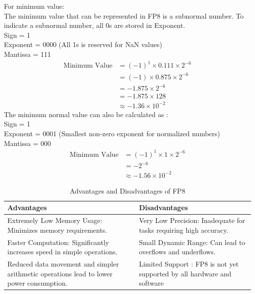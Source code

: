 \documentclass{ioereport}
\begin{document}
\begin{enumerate}[label=\textbf{\roman*.}]
    For minimum value:\\
    The minimum value that can be represented in FP8 is a subnormal number. To indicate a subnormal number, all 0s are stored in Exponent. \\
    Sign = 1 \\
    Exponent = 0000 (All 1s is reserved for NaN values) \\
    Mantissa = 111 
    \[
    \begin{aligned}
        \text{Minimum Value} &= (-1)^{1} \times 0.111 \times 2^{-6} \\
        &= (-1) \times 0.875 \times 2^{-6} \\
        &= -1.875 \times 2^{-6} \\
        &= -1.875 \times 128 \\
        & \approx -1.36 \times 10^{-2}
    \end{aligned}
    \]
    The minimum normal value can also be calculated as : \\
    Sign = 1 \\
    Exponent = 0001 (Smallest non-zero exponent for normalized numbers)\\
    Mantissa = 000
    \[
        \begin{aligned}
            \text{Minimum Value} &= (-1)^{1} \times 1 \times 2^{-6} \\
            & =  -2^{-6} \\
            & \approx -1.56 \times 10^{-2}
        \end{aligned}
    \]

 
    \begin{table}[H]
        \centering
        \caption{Advantages and Disadvantages of FP8}
        \label{tab:fp8}
        \begin{tabular}{|p{6cm}|p{6cm}|}
        \hline
        \textbf{Advantages} & \textbf{Disadvantages} \\
        \hline
        Extremely Low Memory Usage: Minimizes memory requirements. & Very Low Precision: Inadequate for tasks requiring high accuracy. \\
        \hline
        Faster Computation: Significantly increases speed in simple operations. & Small Dynamic Range: Can lead to overflows and underflows. \\
        \hline
        Reduced data movement and simpler arithmetic operations lead to lower power consumption. & Limited Support : FP8 is not yet supported by all hardware and software \\
        \hline
        \end{tabular}
    \end{table}


\end{enumerate}
\end{document}
